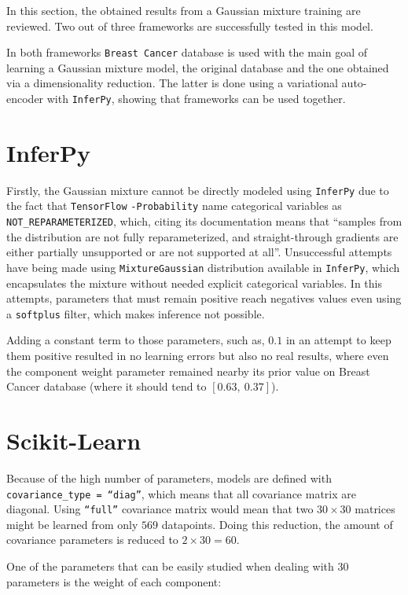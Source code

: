 
In this section, the obtained results from a Gaussian mixture training are reviewed. Two out of three frameworks are successfully tested in this model.

In both frameworks \texttt{Breast Cancer} database is used with the main goal of learning a Gaussian mixture model, the original database and the one obtained via a dimensionality reduction. The latter is done using a variational auto-encoder with \texttt{InferPy}, showing that frameworks can be used together.

\section{InferPy}

Firstly, the Gaussian mixture cannot be directly modeled using \texttt{InferPy} due to the fact that \texttt{TensorFlow} \texttt{-Probability} name categorical variables as \texttt{NOT\_REPARAMETERIZED}, which, citing its documentation means that ``samples from the distribution are not fully reparameterized, and straight-through gradients are either partially unsupported or are not supported at all''. Unsuccessful attempts have being made using \texttt{MixtureGaussian} distribution available in \texttt{InferPy}, which encapsulates the mixture without needed explicit categorical variables. In this attempts, parameters that must remain positive reach negatives values even using a \texttt{softplus} filter, which makes inference not possible.

Adding a constant term to those parameters, such as, \(0.1\) in an attempt to keep them positive resulted in no learning errors but also no real results, where even the component weight parameter remained nearby its prior value on Breast Cancer database (where it should tend to \([0.63,\ 0.37]\)).


\section{Scikit-Learn}

Because of the high number of parameters, models are defined with \texttt{covariance\_type = ``diag''}, which means that all covariance matrix are diagonal. Using \texttt{``full''} covariance matrix would mean that two \(30 \times 30\) matrices might be learned from only \(569\) datapoints. Doing this reduction, the amount of covariance parameters is reduced to \(2\times 30 = 60\).

One of the parameters that can be easily studied when dealing with \(30\) parameters is the weight of each component:

